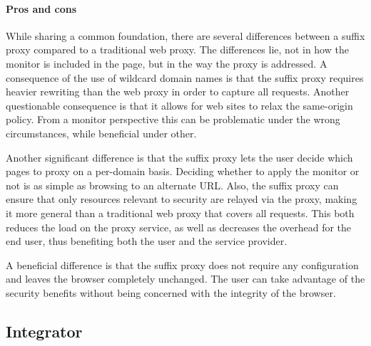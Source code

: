\documentclass{llncs}
\newcommand{\todo}[1]{\colorbox{red}{\textcolor{white}{\sffamily\bfseries\scriptsize TODO}} \textcolor{red}{#1} \textcolor{red}{$\blacktriangleleft$}}
\begin{document}
\vspace{-.4cm}
\paragraph{Pros and cons}

While sharing a common foundation, there are several differences between a 
suffix proxy compared to a traditional web proxy. The differences lie, not in 
how the monitor is included in the page, but in the way the proxy is 
addressed. A consequence of the use of wildcard domain names is that the suffix proxy requires 
heavier rewriting than the web proxy in order to capture all requests.
Another questionable consequence is that it allows for web sites to relax the 
same-origin policy. 
From a monitor perspective this can be problematic under the wrong circumstances, 
while beneficial under other.

Another significant difference is that the suffix proxy lets the user decide which 
pages to proxy on a per-domain basis. Deciding whether to apply the monitor or 
not is as simple as browsing to an alternate URL.
Also, the suffix proxy can ensure that only resources relevant to security are 
relayed via the proxy, making it 
more general than a traditional web proxy that covers all requests. 
This both reduces the load on the proxy service, as well as decreases the 
overhead for the end user, thus benefiting both the user and the service provider.


A beneficial difference is that the suffix proxy does not require any 
configuration and leaves the browser completely unchanged. The user can take
advantage of the security benefits without being concerned with the integrity 
of the browser.

\vspace{-.4cm}
\subsection{Integrator}
\label{sec:arch-integrator}
\vspace{-.2cm}
\end{document}
